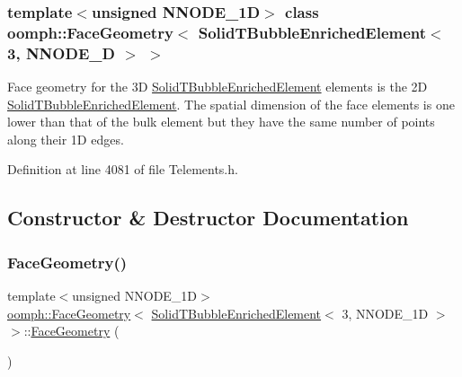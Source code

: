 \subsubsection*{template$<$unsigned N\+N\+O\+D\+E\+\_\+1D$>$\newline
class oomph\+::\+Face\+Geometry$<$ Solid\+T\+Bubble\+Enriched\+Element$<$ 3, N\+N\+O\+D\+E\+\_\+D $>$ $>$}

Face geometry for the 3D \hyperlink{classoomph_1_1SolidTBubbleEnrichedElement}{Solid\+T\+Bubble\+Enriched\+Element} elements is the 2D \hyperlink{classoomph_1_1SolidTBubbleEnrichedElement}{Solid\+T\+Bubble\+Enriched\+Element}. The spatial dimension of the face elements is one lower than that of the bulk element but they have the same number of points along their 1D edges. 

Definition at line 4081 of file Telements.\+h.



\subsection{Constructor \& Destructor Documentation}
\mbox{\label{classoomph_1_1FaceGeometry_3_01SolidTBubbleEnrichedElement_3_013_00_01NNODE__1D_01_4_01_4_a04e1f56dbc0cd3cc7c25dab6d5cc8517}} 
\subsubsection{\texorpdfstring{Face\+Geometry()}{FaceGeometry()}}
{\footnotesize\ttfamily template$<$unsigned N\+N\+O\+D\+E\+\_\+1D$>$ \\
\hyperlink{classoomph_1_1FaceGeometry}{oomph\+::\+Face\+Geometry}$<$ \hyperlink{classoomph_1_1SolidTBubbleEnrichedElement}{Solid\+T\+Bubble\+Enriched\+Element}$<$ 3, N\+N\+O\+D\+E\+\_\+1D $>$ $>$\+::\hyperlink{classoomph_1_1FaceGeometry}{Face\+Geometry} (\begin{DoxyParamCaption}{ }\end{DoxyParamCaption})\hspace{0.3cm}{\ttfamily [inline]}}



